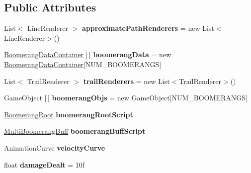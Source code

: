 \subsection*{Public Attributes}
\begin{DoxyCompactItemize}
\item 
\hypertarget{class_boomerang_throw_ad1653fe26b5503dfd1aa4dcff3bd29af}{}\label{class_boomerang_throw_ad1653fe26b5503dfd1aa4dcff3bd29af} 
List$<$ Line\+Renderer $>$ {\bfseries approximate\+Path\+Renderers} = new List$<$Line\+Renderer$>$()
\item 
\hypertarget{class_boomerang_throw_afeb7e6f47220ade75d5c59d339f493f6}{}\label{class_boomerang_throw_afeb7e6f47220ade75d5c59d339f493f6} 
\hyperlink{class_boomerang_data_container}{Boomerang\+Data\+Container} \mbox{[}$\,$\mbox{]} {\bfseries boomerang\+Data} = new \hyperlink{class_boomerang_data_container}{Boomerang\+Data\+Container}\mbox{[}N\+U\+M\+\_\+\+B\+O\+O\+M\+E\+R\+A\+N\+GS\mbox{]}
\item 
\hypertarget{class_boomerang_throw_a28000e67ed58a8cf5243570e04ac264d}{}\label{class_boomerang_throw_a28000e67ed58a8cf5243570e04ac264d} 
List$<$ Trail\+Renderer $>$ {\bfseries trail\+Renderers} = new List$<$Trail\+Renderer$>$()
\item 
\hypertarget{class_boomerang_throw_a60c37de066e4c9ef0af360fb8972be69}{}\label{class_boomerang_throw_a60c37de066e4c9ef0af360fb8972be69} 
Game\+Object \mbox{[}$\,$\mbox{]} {\bfseries boomerang\+Objs} = new Game\+Object\mbox{[}N\+U\+M\+\_\+\+B\+O\+O\+M\+E\+R\+A\+N\+GS\mbox{]}
\item 
\hypertarget{class_boomerang_throw_a6b868248c71f07e200c4a5a7f7a3bd28}{}\label{class_boomerang_throw_a6b868248c71f07e200c4a5a7f7a3bd28} 
\hyperlink{class_boomerang_root}{Boomerang\+Root} {\bfseries boomerang\+Root\+Script}
\item 
\hypertarget{class_boomerang_throw_a1937f8e1e4bc7a05ee9a1ca54b158722}{}\label{class_boomerang_throw_a1937f8e1e4bc7a05ee9a1ca54b158722} 
\hyperlink{class_multi_boomerang_buff}{Multi\+Boomerang\+Buff} {\bfseries boomerang\+Buff\+Script}
\item 
\hypertarget{class_boomerang_throw_a8624b249cf9d2d4007c553d53189e416}{}\label{class_boomerang_throw_a8624b249cf9d2d4007c553d53189e416} 
Animation\+Curve {\bfseries velocity\+Curve}
\item 
\hypertarget{class_boomerang_throw_a4aefc802c1465c09df970f5f935fcb35}{}\label{class_boomerang_throw_a4aefc802c1465c09df970f5f935fcb35} 
float {\bfseries damage\+Dealt} = 10f
\item 

\end{DoxyCompactItemize}
